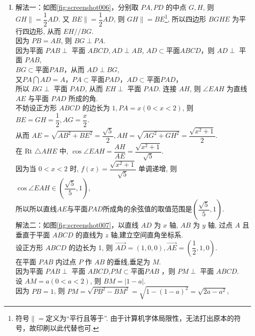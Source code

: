 \documentclass[11pt]{article}
\begin{document}
\begin{enumerate}
\begin{enumerate}[(I)]
		\item \heiti 解法一：\songti 如图\ref{fig:screenshot006}，分别取 $P A, P D$ 的中点 $G, H$, 则 $G H \parallel = \dfrac{1}{2} A D$.
		又 $B E \parallel = \dfrac{1}{2} A D$, 则 $G H \parallel = B E$\footnote{符号$ \parallel =  $定义为“平行且等于”. 由于计算机字体局限性，无法打出原本的符号，故印刷以此代替也可.}, 所以四边形 $B G H E$ 为平行四边形, 从而 $E H / / B G$.
		\\因为 $P B=A B$, 则 $B G \perp P A$. 
		\\因为平面 $P A B \perp$ 平面 $A B C D, A D \perp A B$, $ AD\subset $平面$ABCD$，则 $A D \perp$ 平面 $P A B$,
		\\$ BG\subset $平面$ PAB $，从而 $A D \perp B G$, 
		\\又$ PA\bigcap AD=A $，$ PA\subset  $平面$ PAD $，$ AD\subset  $平面$ PAD $，
		\\所以 $B G \perp$ 平面 $P A D$, 从而 $E H \perp$ 平面 $P A D$.
		连接 $A H$, 则 $\angle E A H$ 为直线 $A E$ 与平面 $P A D$ 所成的角.
		\\不妨设正方形 $A B C D$ 的边长为 $1, P A=x(0<x<2)$, 则 $B E=G H=\dfrac{1}{2}, A G=\dfrac{x}{2}$.
		\\从而 $A E=\sqrt{A B^{2}+B E^{2}}=\dfrac{\sqrt{5}}{2}, A H=\sqrt{A G^{2}+G H^{2}}=\dfrac{\sqrt{x^{2}+1}}{2}$.
		\\在 Rt $\triangle A H E$ 中, $\cos \angle E A H=\dfrac{A H}{A E}=\dfrac{\sqrt{x^{2}+1}}{\sqrt{5}}$.
		\\因为当 $0<x<2$ 时, $f(x)=\dfrac{\sqrt{x^{2}+1}}{\sqrt{5}}$ 单调递增, 则 $\cos \angle E A H \in\left(\dfrac{\sqrt{5}}{5}, 1\right)$,
		\\所以所以直线$ AE $与平面$ PAD $所成角的余弦值的取值范围是$ \left(\dfrac{\sqrt{5}}{5}, 1\right) $.
		\\ \heiti 解法二：\songti 如图\ref{fig:screenshot007}，以直线 $A D$ 为 $x$ 轴, $A B$ 为 $y$ 轴, 过点 $A$ 且垂直于平面 $A B C D$ 的直线为 $z$ 轴,建立空间直角坐标系. 
		\\设正方形 $A B C D$ 的边长为 1, 则 $\overrightarrow{A D}=(1,0,0), \overrightarrow{A E}=\left(\dfrac{1}{2}, 1,0\right) .$
		\\在平面 $P A B$ 内过点 $P$ 作 $A B$ 的垂线,垂足为 $M .$
		\\因为平面 $P A B \perp$ 平面 $A B C D$,$ PM\subset  $平面$ PAB $ ，则 $P M \perp$ 平面 $A B C D .$
		\\设 $A M=a(0<a<2)$, 则 $B M=|1-a| .$
		\\因为 $P B=1$, 则 $P M=\sqrt{P B^{2}-B M^{2}}=\sqrt{1-(1-a)^{2}}=\sqrt{2 a-a^{2}}$, 

\end{enumerate}
\end{enumerate}
\end{document}
